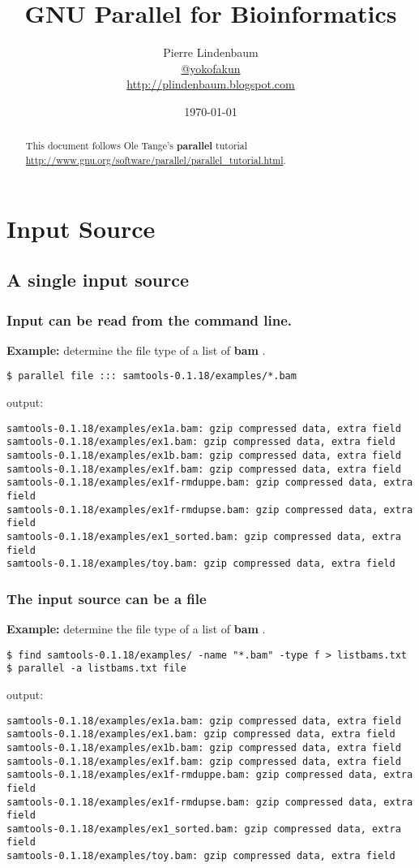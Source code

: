 \documentclass{article}
\date{\today}
\title{GNU Parallel for Bioinformatics}
\author{Pierre Lindenbaum\\\href{https://twitter.com/yokofakun}{@yokofakun}\\\url{http://plindenbaum.blogspot.com} }
\newcommand{\example}[1]{
\textbf{Example: } {\color[rgb]{0,0,1} #1 } .
}
\def\prl{\textbf{parallel}}
\def\bam{\textbf{bam}}
\begin{document}
\maketitle
\begin{abstract}
This document follows Ole Tange's \prl{} tutorial \url{http://www.gnu.org/software/parallel/parallel_tutorial.html}.
\end{abstract}

\tableofcontents

\section{Input Source}
\subsection{A single input source}
\subsubsection{Input can be read from the command line.}

\example{determine the file type of a list of \bam{}}
\begin{lstlisting}
$ parallel file ::: samtools-0.1.18/examples/*.bam
\end{lstlisting}
output:
\begin{lstlisting}
samtools-0.1.18/examples/ex1a.bam: gzip compressed data, extra field
samtools-0.1.18/examples/ex1.bam: gzip compressed data, extra field
samtools-0.1.18/examples/ex1b.bam: gzip compressed data, extra field
samtools-0.1.18/examples/ex1f.bam: gzip compressed data, extra field
samtools-0.1.18/examples/ex1f-rmduppe.bam: gzip compressed data, extra field
samtools-0.1.18/examples/ex1f-rmdupse.bam: gzip compressed data, extra field
samtools-0.1.18/examples/ex1_sorted.bam: gzip compressed data, extra field
samtools-0.1.18/examples/toy.bam: gzip compressed data, extra field
\end{lstlisting}

\subsubsection{The input source can be a file}
\example{determine the file type of a list of \bam{}}
\begin{lstlisting}
$ find samtools-0.1.18/examples/ -name "*.bam" -type f > listbams.txt
$ parallel -a listbams.txt file
\end{lstlisting}
output:
\begin{lstlisting}
samtools-0.1.18/examples/ex1a.bam: gzip compressed data, extra field
samtools-0.1.18/examples/ex1.bam: gzip compressed data, extra field
samtools-0.1.18/examples/ex1b.bam: gzip compressed data, extra field
samtools-0.1.18/examples/ex1f.bam: gzip compressed data, extra field
samtools-0.1.18/examples/ex1f-rmduppe.bam: gzip compressed data, extra field
samtools-0.1.18/examples/ex1f-rmdupse.bam: gzip compressed data, extra field
samtools-0.1.18/examples/ex1_sorted.bam: gzip compressed data, extra field
samtools-0.1.18/examples/toy.bam: gzip compressed data, extra field
\end{lstlisting}
\end{document}
